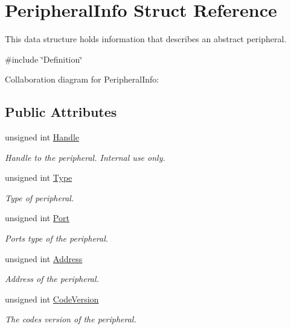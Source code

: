 \hypertarget{struct_peripheral_info}{}\section{Peripheral\+Info Struct Reference}
\label{struct_peripheral_info}


This data structure holds information that describes an abstract peripheral.  




{\ttfamily \#include \char`\"{}Definition\char`\"{}}



Collaboration diagram for Peripheral\+Info\+:
\subsection*{Public Attributes}
\begin{DoxyCompactItemize}
\item 
unsigned int \hyperlink{struct_peripheral_info_ad63ba012f47f06ba9eb5baa1e5c49cfb}{Handle}
\begin{DoxyCompactList}\small\item\em Handle to the peripheral. Internal use only. \end{DoxyCompactList}\item 
unsigned int \hyperlink{struct_peripheral_info_a68ed2672dbb345ad711011834439be4e}{Type}
\begin{DoxyCompactList}\small\item\em Type of peripheral. \end{DoxyCompactList}\item 
unsigned int \hyperlink{struct_peripheral_info_acf5f236a5c5c7923edd5175ac00ae3c5}{Port}
\begin{DoxyCompactList}\small\item\em Port\textquotesingle{}s type of the peripheral. \end{DoxyCompactList}\item 
unsigned int \hyperlink{struct_peripheral_info_a18255b4f0485ada8f5658e30a6c8486e}{Address}
\begin{DoxyCompactList}\small\item\em Address of the peripheral. \end{DoxyCompactList}\item 
unsigned int \hyperlink{struct_peripheral_info_a871b1f912f52fd20a1e8bd120ed81422}{Code\+Version}
\begin{DoxyCompactList}\small\item\em The code\textquotesingle{}s version of the peripheral. \end{DoxyCompactList}\end{DoxyCompactItemize}


